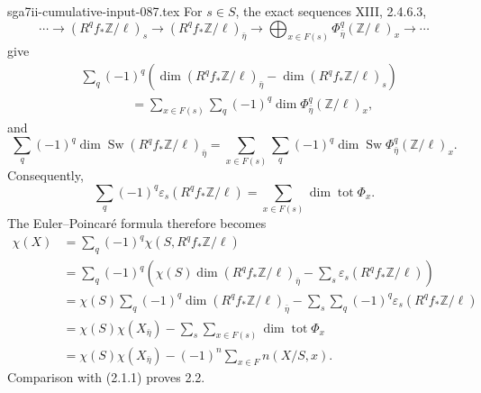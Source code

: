 \begin{filecontents*}{sga7ii-cumulative-input-087.tex}
For $s\in S$, the exact sequences XIII, 2.4.6.3,
\[
\cdots\longrightarrow(R^qf_*\mathbb Z/\ell)_s
\longrightarrow(R^qf_*\mathbb Z/\ell)_{\bar\eta}
\longrightarrow\bigoplus_{x\in F(s)}
\Phi^q_{\bar\eta}(\mathbb Z/\ell)_x
\longrightarrow\cdots
\]
give
\begin{align*}
&\sum_q(-1)^q\left(
\dim(R^qf_*\mathbb Z/\ell)_{\bar\eta}
-\dim(R^qf_*\mathbb Z/\ell)_s\right)\\
&\hspace{4em}=\sum_{x\in F(s)}\sum_q(-1)^q
\dim\Phi^q_{\bar\eta}(\mathbb Z/\ell)_x,
\end{align*}
and
\[
\sum_q(-1)^q\dim\operatorname{Sw}
(R^qf_*\mathbb Z/\ell)_{\bar\eta}
=\sum_{x\in F(s)}\sum_q(-1)^q
\dim\operatorname{Sw}\Phi^q_{\bar\eta}(\mathbb Z/\ell)_x.
\]
Consequently,
\begin{equation}\tag{c}
\sum_q(-1)^q\varepsilon_s(R^qf_*\mathbb Z/\ell)
=\sum_{x\in F(s)}\dim\operatorname{tot}\Phi_x.
\end{equation}
The Euler--Poincar\'e formula therefore becomes
\begin{align*}
\chi(X)
&=\sum_q(-1)^q\chi(S,R^qf_*\mathbb Z/\ell)\\
&=\sum_q(-1)^q\left(
\chi(S)\dim(R^qf_*\mathbb Z/\ell)_{\bar\eta}
-\sum_s\varepsilon_s(R^qf_*\mathbb Z/\ell)\right)\\
&=\chi(S)\sum_q(-1)^q
\dim(R^qf_*\mathbb Z/\ell)_{\bar\eta}
-\sum_s\sum_q(-1)^q\varepsilon_s(R^qf_*\mathbb Z/\ell)\\
&=\chi(S)\chi(X_{\bar\eta})
-\sum_s\sum_{x\in F(s)}\dim\operatorname{tot}\Phi_x\\
&=\chi(S)\chi(X_{\bar\eta})
-(-1)^n\sum_{x\in F}n(X/S,x).
\end{align*}
Comparison with (2.1.1) proves 2.2.
\end{filecontents*}
